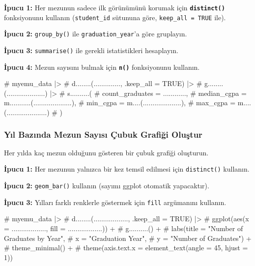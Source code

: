\documentclass[
  11pt,
  a4paper,
  DIV=11,
  numbers=noendperiod]{scrartcl}
\newenvironment{Shaded}{\begin{snugshade}}{\end{snugshade}}
\newcommand{\CommentTok}[1]{\textcolor[rgb]{0.37,0.37,0.37}{#1}}
\begin{document}
\textbf{İpucu 1:} Her mezunun sadece ilk görünümünü korumak için
\textbf{\texttt{distinct()}} fonksiyonunu kullanın (\texttt{student\_id}
sütununa göre, \texttt{keep\_all\ =\ TRUE} ile).

\textbf{İpucu 2:} \texttt{group\_by()} ile \texttt{graduation\_year}'a
göre gruplayın.

\textbf{İpucu 3:} \texttt{summarise()} ile gerekli istatistikleri
hesaplayın.

\textbf{İpucu 4:} Mezun sayısını bulmak için \textbf{\texttt{n()}}
fonksiyonunu kullanın.

\begin{Shaded}
\begin{Highlighting}[]
\CommentTok{\# myemu\_data |\textgreater{}}
\CommentTok{\#   d........(.............., .keep\_all = TRUE) |\textgreater{}}
\CommentTok{\#   g........(....................) |\textgreater{}}
\CommentTok{\#   s..........(}
\CommentTok{\#     count\_graduates = ............,}
\CommentTok{\#     median\_cgpa = m...........(....................),}
\CommentTok{\#     min\_cgpa = m....(....................),}
\CommentTok{\#     max\_cgpa = m....(.....................)}
\CommentTok{\#   )}
\end{Highlighting}
\end{Shaded}

\subsubsection{Yıl Bazında Mezun Sayısı Çubuk Grafiği
Oluştur}\label{yux131l-bazux131nda-mezun-sayux131sux131-uxe7ubuk-grafiux11fi-oluux15ftur}

Her yılda kaç mezun olduğunu gösteren bir çubuk grafiği oluşturun.

\textbf{İpucu 1:} Her mezunun yalnızca bir kez temsil edilmesi için
\texttt{distinct()} kullanın.

\textbf{İpucu 2:} \texttt{geom\_bar()} kullanın (sayımı ggplot otomatik
yapacaktır).

\textbf{İpucu 3:} Yılları farklı renklerle göstermek için \texttt{fill}
argümanını kullanın.

\begin{Shaded}
\begin{Highlighting}[]
\CommentTok{\# myemu\_data |\textgreater{}}
\CommentTok{\#   d........(.................., .keep\_all = TRUE) |\textgreater{}}
\CommentTok{\#   ggplot(aes(x = .................., fill = ..................)) +}
\CommentTok{\#   g..........() +}
\CommentTok{\#   labs(title = "Number of Graduates by Year",}
\CommentTok{\#        x = "Graduation Year",}
\CommentTok{\#        y = "Number of Graduates") +}
\CommentTok{\#   theme\_minimal() +}
\CommentTok{\#   theme(axis.text.x = element\_text(angle = 45, hjust = 1))}
\end{Highlighting}
\end{Shaded}
\end{document}
